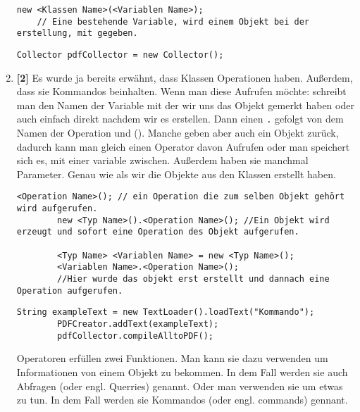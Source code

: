 \begin{enumerate}
\begin{lstlisting}[title=\textbf{Variablen Syntax}]
    new <Klassen Name>(<Variablen Name>); 
    // Eine bestehende Variable, wird einem Objekt bei der erstellung, mit gegeben.
          \end{lstlisting}
          \begin{lstlisting}[title=\textbf{Beispiel (2/3) Variablen},firstnumber=1,frame=ltr]
            Collector pdfCollector = new Collector();
        \end{lstlisting}
    \item \textbf{[2]} Es wurde ja bereits erwähnt, dass Klassen Operationen haben. Außerdem, dass sie  Kommandos beinhalten. Wenn man diese Aufrufen möchte: schreibt man den Namen der Variable mit der wir uns das Objekt gemerkt haben oder auch einfach direkt nachdem wir es erstellen. Dann einen \lstinline{.} gefolgt von dem Namen der Operation und (). Manche geben aber auch ein Objekt zurück, dadurch kann man gleich einen Operator davon Aufrufen oder man speichert sich es, mit einer variable zwischen. Außerdem haben sie manchmal Parameter. Genau wie als wir die Objekte aus den Klassen erstellt haben.
          \begin{lstlisting}[title=\textbf{Kommando Syntax},firstnumber=4]
        <Operation Name>(); // ein Operation die zum selben Objekt gehört wird aufgerufen.
        new <Typ Name>().<Operation Name>(); //Ein Objekt wird erzeugt und sofort eine Operation des Objekt aufgerufen.

        <Typ Name> <Variablen Name> = new <Typ Name>();
        <Variablen Name>.<Operation Name>();
        //Hier wurde das objekt erst erstellt und dannach eine Operation aufgerufen.
            \end{lstlisting}
          \begin{lstlisting}[title=\textbf{Beispiel 3/3 Kommandos},firstnumber=3,frame=lbr]
        String exampleText = new TextLoader().loadText("Kommando");
        PDFCreator.addText(exampleText);
        pdfCollector.compileAlltoPDF();
              \end{lstlisting}
          \begin{Infobox}[Operationen]
              Operatoren erfüllen zwei Funktionen. Man kann sie dazu verwenden um Informationen von einem Objekt zu bekommen.
              In dem Fall werden sie auch Abfragen (oder engl. Querries) genannt.
              Oder man verwenden sie um etwas zu tun. In dem Fall werden sie Kommandos (oder engl. commands) gennant.
          \end{Infobox}


\end{enumerate}
